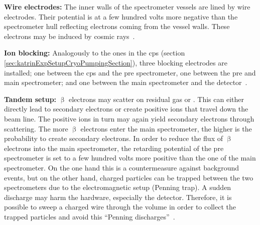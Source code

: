 {\par \textbf{Wire electrodes:} The inner walls of the spectrometer vessels are lined by wire electrodes. Their potential is at a few hundred volts more negative than the spectrometer hull reflecting electrons coming from the vessel walls. These electrons may be induced by cosmic rays~\cite{Valerius2009}.}
	
{\par \textbf{Ion blocking:} Analogously to the ones in the \gls{cps} (section \ref{sec:katrinExpSetupCryoPumpingSection}), three blocking electrodes are installed; one between the \gls{cps} and the pre spectrometer, one between the pre and main spectrometer; and one between the main spectrometer and the detector~\cite{Klein2019}.}
	
{\par \textbf{Tandem setup:} $\upbeta$ electrons may scatter on residual gas or . This can either directly lead to secondary electrons or create positive ions that travel down the beam line. The positive ions in turn may again yield secondary electrons through scattering. The more $\upbeta$ electrons enter the main spectrometer, the higher is the probability to create secondary electrons. In order to reduce the flux of $\upbeta$ electrons into the main spectrometer, the retarding potential of the pre spectrometer is set to a few hundred volts more positive than the one of the main spectrometer. On the one hand this is a countermeasure against background events, but on the other hand, charged particles can be trapped between the two spectrometers due to the electromagnetic setup (Penning trap). A sudden discharge may harm the hardware, especially the detector. Therefore, it is possible to sweep a charged wire through the volume in order to collect the trapped particles and avoid this ``Penning discharges''~\cite{Valerius2009}.}